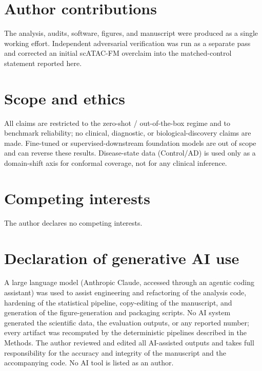 \documentclass[fleqn,10pt,lineno]{wlpeerj}  %
\begin{document}
\section*{Author contributions}
The analysis, audits, software, figures, and manuscript were produced as a single working effort. Independent adversarial verification was run as a separate pass and corrected an initial scATAC-FM overclaim into the matched-control statement reported here.

\section*{Scope and ethics}
All claims are restricted to the zero-shot / out-of-the-box regime and to benchmark reliability; no clinical, diagnostic, or biological-discovery claims are made. Fine-tuned or supervised-downstream foundation models are out of scope and can reverse these results. Disease-state data (Control/AD) is used only as a domain-shift axis for conformal coverage, not for any clinical inference.

\section*{Competing interests}
The author declares no competing interests.

\section*{Declaration of generative AI use}
A large language model (Anthropic Claude, accessed through an agentic coding assistant) was used to assist engineering and refactoring of the analysis code, hardening of the statistical pipeline, copy-editing of the manuscript, and generation of the figure-generation and packaging scripts. No AI system generated the scientific data, the evaluation outputs, or any reported number; every artifact was recomputed by the deterministic pipelines described in the Methods. The author reviewed and edited all AI-assisted outputs and takes full responsibility for the accuracy and integrity of the manuscript and the accompanying code. No AI tool is listed as an author.
\end{document}

